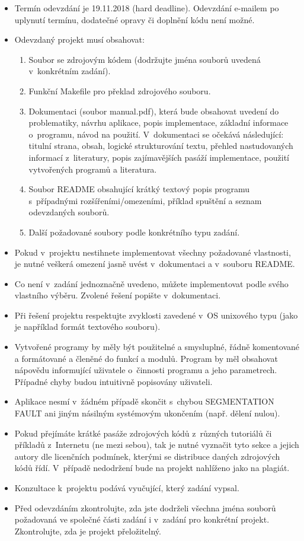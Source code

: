 \documentclass[11pt, a4paper, titlepage]{article}
\begin{document}
\begin{itemize}
	\item Termín odevzdání je 19.11.2018 (hard deadline). Odevzdání e-mailem po uplynutí termínu, dodatečné opravy či doplnění kódu není možné.
	\item Odevzdaný projekt musí obsahovat:
	\begin{enumerate}
		\item Soubor se zdrojovým kódem (dodržujte jména souborů uvedená v~konkrétním zadání).
		\item Funkční Makefile pro překlad zdrojového souboru.
		\item Dokumentaci (soubor manual.pdf), která bude obsahovat uvedení do problematiky, návrhu aplikace, popis implementace, základní informace o~programu, návod na použití. V~dokumentaci se očekává následující: titulní strana, obsah, logické strukturování textu, přehled nastudovaných informací z~literatury, popis zajímavějších pasáží implementace, použití vytvořených programů a literatura.
		\item Soubor README obsahující krátký textový popis programu s~případnými rozšířeními/omezeními, příklad spuštění a seznam odevzdaných souborů.
		\item Další požadované soubory podle konkrétního typu zadání.
	\end{enumerate}
	\item Pokud v~projektu nestihnete implementovat všechny požadované vlastnosti, je nutné veškerá omezení jasně uvést v~dokumentaci a v~souboru README.
	\item Co není v~zadání jednoznačně uvedeno, můžete implementovat podle svého vlastního výběru. Zvolené řešení popište v~dokumentaci.
	\item Při řešení projektu respektujte zvyklosti zavedené v~OS unixového typu (jako je například formát textového souboru).
	\item Vytvořené programy by měly být použitelné a smysluplné, řádně komentované a formátované a členěné do funkcí a modulů. Program by měl obsahovat nápovědu informující uživatele o~činnosti programu a jeho parametrech. Případné chyby budou intuitivně popisovány uživateli.
	\item Aplikace nesmí v~žádném případě skončit s~chybou SEGMENTATION FAULT ani jiným násilným systémovým ukončením (např. dělení nulou).
	\item Pokud přejímáte krátké pasáže zdrojových kódů z~různých tutoriálů či příkladů z~Internetu (ne mezi sebou), tak je nutné vyznačit tyto sekce a jejich autory dle licenčních podmínek, kterými se distribuce daných zdrojových kódů řídí. V~případě nedodržení bude na projekt nahlíženo jako na plagiát.
	\item Konzultace k~projektu podává vyučující, který zadání vypsal.
	\item Před odevzdáním zkontrolujte, zda jste dodrželi všechna jména souborů požadovaná ve společné části zadání i v~zadání pro konkrétní projekt. Zkontrolujte, zda je projekt přeložitelný.
\end{itemize}
\end{document}
